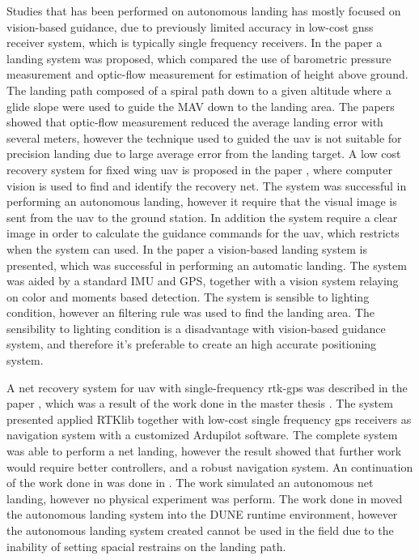 Studies that has been performed on autonomous landing has mostly focused on vision-based guidance, due to previously limited accuracy in low-cost \gls{gnss} receiver system, which is typically single frequency receivers. In the paper \citep{barber2007autonomous} a landing system was proposed, which compared the use of barometric pressure measurement and optic-flow measurement for estimation of height above ground. The landing path composed of a spiral path down to a given altitude where a glide slope were used to guide the MAV down to the landing area. The papers showed that optic-flow measurement reduced the average landing error with several meters, however the technique used to guided the \gls{uav} is not suitable for precision landing due to large average error from the landing target. A low cost recovery system for fixed wing \gls{uav} is proposed in the paper \citep{kim2013fully}, where computer vision is used to find and identify the recovery net. The system was successful in performing an autonomous landing, however it require that the visual image is sent from the \gls{uav} to the ground station. In addition the system require a clear image in order to calculate the guidance commands for the \gls{uav}, which restricts when the system can used. In the paper \citep{huh2010vision} a vision-based landing system is presented, which was successful in performing an automatic landing. The system was aided by a standard IMU and GPS, together with a vision system relaying on color and moments based detection. The system is sensible to lighting condition, however an filtering rule was used to find the landing area. The sensibility to lighting condition is a disadvantage with vision-based guidance system, and therefore it's preferable to create an high accurate positioning system.

A net recovery system for \gls{uav} with single-frequency \gls{rtk-gps} was described in the paper \citep{skulstad2015net}, which was a result of the work done in the master thesis \citep{Skulstad&Syversen}. The system presented applied RTKlib together with low-cost single frequency \gls{gps} receivers as navigation system with a customized Ardupilot software. The complete system was able to perform a net landing, however the result showed that further work would require better controllers, and a robust navigation system. An continuation of the work done in \citep{Skulstad&Syversen} was done in \citep{Froelich}. The work simulated an autonomous net landing, however no physical experiment was perform. The work done in \citep{Froelich} moved the autonomous landing system into the DUNE runtime environment, however the autonomous landing system created cannot be used in the field due to the inability of setting spacial restrains on the landing path.

